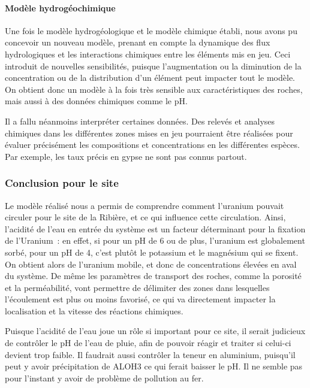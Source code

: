 \documentclass{article}
\begin{document}
\paragraph{Modèle hydrogéochimique}

Une fois le modèle hydrogéologique et le modèle chimique établi, nous avons pu concevoir un nouveau modèle, prenant en compte la dynamique des flux hydrologiques et les interactions chimiques entre les éléments mis en jeu. Ceci introduit de nouvelles sensibilités, puisque l’augmentation ou la diminution de la concentration ou de la distribution d’un élément peut impacter tout le modèle. On obtient donc un modèle à la fois très sensible aux caractéristiques des roches, mais aussi à des données chimiques comme le pH.

Il a fallu néanmoins interpréter certaines données. Des relevés et analyses chimiques dans les différentes zones mises en jeu pourraient être réalisées pour évaluer précisément les compositions et concentrations en les différentes espèces. Par exemple, les taux précis en gypse ne sont pas connus partout.

\subsubsection{Conclusion pour le site}
Le modèle réalisé nous a permis de comprendre comment l’uranium pouvait circuler pour le site de la Ribière, et ce qui influence cette circulation. Ainsi, l’acidité de l’eau en entrée du système est un facteur déterminant pour la fixation de l’Uranium : en effet, si pour un pH de 6 ou de plus, l’uranium est globalement sorbé, pour un pH de 4, c’est plutôt le potassium et le magnésium qui se fixent. On obtient alors de l’uranium mobile, et donc de concentrations élevées en aval du système. De même les paramètres de transport des roches, comme la porosité et la perméabilité, vont permettre de délimiter des zones dans lesquelles l’écoulement est plus ou moins favorisé, ce qui va directement impacter la localisation et la vitesse des réactions chimiques.

Puisque l’acidité de l’eau joue un rôle si important pour ce site, il serait judicieux de contrôler le pH de l’eau de pluie, afin de pouvoir réagir et traiter si celui-ci devient trop faible. Il faudrait aussi contrôler la teneur en aluminium, puisqu’il peut y avoir précipitation de ALOH3 ce qui ferait baisser le pH. Il ne semble pas pour l’instant y avoir de problème de pollution au fer.
\end{document}
